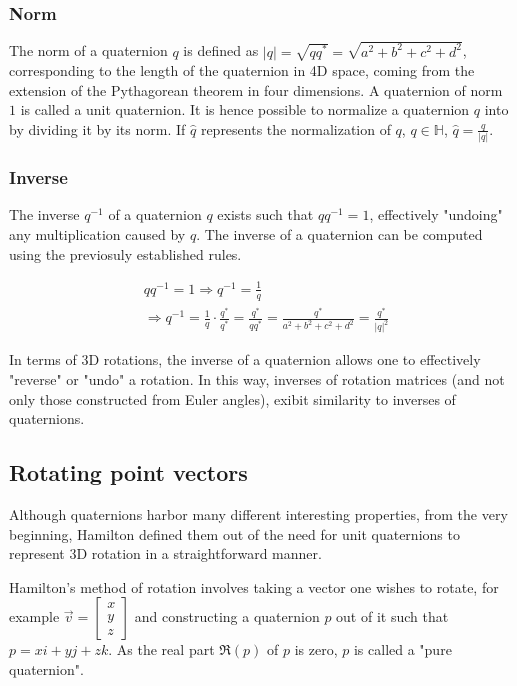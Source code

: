 \documentclass[12pt, a4paper]{article}
\begin{document}
\subsubsection{Norm}
The norm of a quaternion $q$ is defined as $|q| = \sqrt{qq^*} = \sqrt{a^2 + b^2
+ c^2 + d^2}$, corresponding to the length of the quaternion in 4D space, coming
from the extension of the Pythagorean theorem in four dimensions. A quaternion
of norm $1$ is called a unit quaternion. It is hence possible to normalize a
quaternion $q$ into by dividing it by its norm. If $\hat{q}$ represents the
normalization of $q$, $q \in \mathbb{H}$, $\hat{q} = \frac{q}{|q|}$. \\

\pagebreak

\subsubsection{Inverse}
The inverse $q^{-1}$ of a quaternion $q$ exists such that $qq^{-1} = 1$,
effectively "undoing" any multiplication caused by $q$. The inverse of a
quaternion can be computed using the previosuly established rules.

\begin{align*}
     & qq^{-1} = 1 \Rightarrow q^{-1} = \frac{1}{q}         \\
     & \Rightarrow q^{-1} = \frac{1}{q} \cdot \frac{q^*}{q^*} = \frac{q^*}{qq^*}
    = \frac{q^*}{a^2 + b^2 + c^2 + d^2} = \frac{q^*}{|q|^2}
\end{align*}

In terms of 3D rotations, the inverse of a quaternion allows one to effectively
"reverse" or "undo" a rotation. In this way, inverses of rotation matrices (and
not only those constructed from Euler angles), exibit similarity to inverses of
quaternions.

\subsection{Rotating point vectors}
Although quaternions harbor many different interesting properties, from the very
beginning, Hamilton defined them out of the need for unit quaternions to
represent 3D rotation in a straightforward manner.

Hamilton's method of rotation involves taking a vector one wishes to rotate, for
example $\vec{v} = \begin{bmatrix} x \\ y \\ z \end{bmatrix}$ and constructing a
quaternion $p$ out of it such that $p = xi + yj + zk$. As the real part $\Re(p)$
of $p$ is zero, $p$ is called a "pure quaternion". \\
\end{document}
